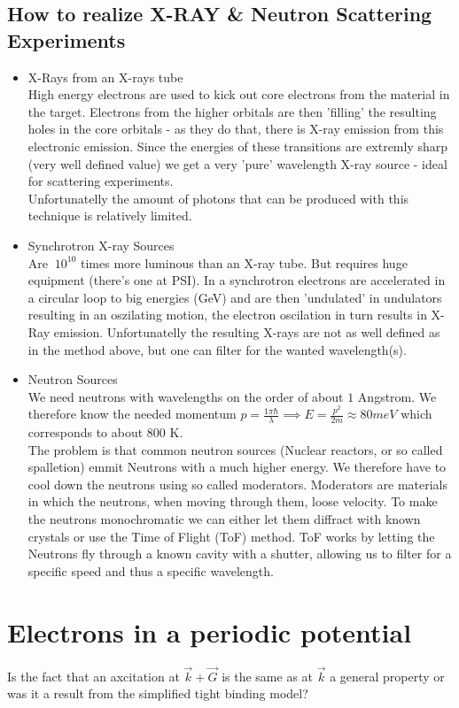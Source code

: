 \documentclass{report}
\begin{document}
\section{How to realize X-RAY \& Neutron Scattering Experiments}
\begin{itemize}
	\item X-Rays from an X-rays tube\\
		High energy electrons are used to kick out core electrons from the material in the target. Electrons from the higher orbitals are then 'filling' the resulting holes in the core orbitals - as they do that, there is X-ray emission from this electronic emission. Since the energies of these transitions are extremly sharp (very well defined value) we get a very 'pure' wavelength X-ray source - ideal for scattering experiments.\\
		Unfortunatelly the amount of photons that can be produced with this technique is relatively limited.
	\item Synchrotron X-ray Sources\\
		Are $~10^10$ times more luminous than an X-ray tube. But requires huge equipment (there's one at PSI). In a synchrotron electrons are accelerated in a circular loop to big energies (GeV) and are then 'undulated' in undulators resulting in an oszilating motion, the electron oscilation in turn results in X-Ray emission. Unfortunatelly the resulting X-rays are not as well defined as in the method above, but one can filter for the wanted wavelength(s).
	\item Neutron Sources\\
		We need neutrons with wavelengths on the order of about $1$ Angstrom. We therefore know the needed momentum $p = \frac{1\pi \hbar}{\lambda} \implies E = \frac{p^2}{2m} \approx 80 meV$ which corresponds to about $800$ K.\\
		The problem is that common neutron sources (Nuclear reactors, or so called spalletion) emmit Neutrons with a much higher energy. We therefore have to cool down the neutrons using so called moderators. Moderators are materials in which the neutrons, when moving through them, loose velocity. To make the neutrons monochromatic we can either let them diffract with known crystals or use the Time of Flight (ToF) method. ToF works by letting the Neutrons fly through a known cavity with a shutter, allowing us to filter for a specific speed and thus a specific wavelength.
\end{itemize}
\chapter{Electrons in a periodic potential}
Is the fact that an axcitation at $\vec{k} + \vec{G}$ is the same as at $\vec{k}$ a general property or was it a result from the simplified tight binding model?
\end{document}
